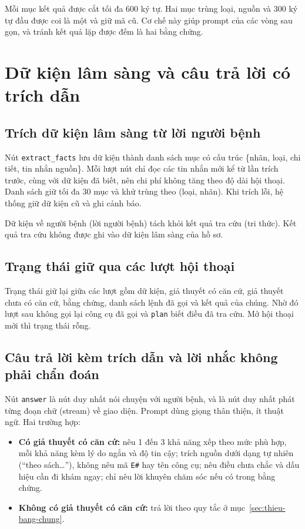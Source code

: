 Mỗi mục kết quả được cắt tối đa 600 ký tự. Hai mục trùng loại, nguồn và 300 ký tự đầu được coi là một và giữ mã cũ. Cơ chế này giúp prompt của các vòng sau gọn, và tránh kết quả lặp được đếm là hai bằng chứng.

\section{Dữ kiện lâm sàng và câu trả lời có trích dẫn}

\subsection{Trích dữ kiện lâm sàng từ lời người bệnh}

Nút \texttt{extract\_facts} lưu dữ kiện thành danh sách mục có cấu trúc \{nhãn, loại, chi tiết, tin nhắn nguồn\}. Mỗi lượt nút chỉ đọc các tin nhắn mới kể từ lần trích trước, cùng với dữ kiện đã biết, nên chi phí không tăng theo độ dài hội thoại. Danh sách giữ tối đa 30 mục và khử trùng theo (loại, nhãn). Khi trích lỗi, hệ thống giữ dữ kiện cũ và ghi cảnh báo.

Dữ kiện về người bệnh (lời người bệnh) tách khỏi kết quả tra cứu (tri thức). Kết quả tra cứu không được ghi vào dữ kiện lâm sàng của hồ sơ.

\subsection{Trạng thái giữ qua các lượt hội thoại}

Trạng thái giữ lại giữa các lượt gồm dữ kiện, giả thuyết có căn cứ, giả thuyết chưa có căn cứ, bằng chứng, danh sách lệnh đã gọi và kết quả của chúng. Nhờ đó lượt sau không gọi lại công cụ đã gọi và \texttt{plan} biết điều đã tra cứu. Mở hội thoại mới thì trạng thái rỗng.

\subsection{Câu trả lời kèm trích dẫn và lời nhắc không phải chẩn đoán}

Nút \texttt{answer} là nút duy nhất nói chuyện với người bệnh, và là nút duy nhất phát từng đoạn chữ (stream) về giao diện. Prompt dùng giọng thân thiện, ít thuật ngữ. Hai trường hợp:
\begin{itemize}
  \item \textbf{Có giả thuyết có căn cứ:} nêu 1 đến 3 khả năng xếp theo mức phù hợp, mỗi khả năng kèm lý do ngắn và độ tin cậy; trích nguồn dưới dạng tự nhiên (``theo sách\ldots''), không nêu mã \texttt{E\#} hay tên công cụ; nêu điều chưa chắc và dấu hiệu cần đi khám ngay; chỉ nêu lời khuyên chăm sóc nếu có trong bằng chứng.
  \item \textbf{Không có giả thuyết có căn cứ:} trả lời theo quy tắc ở mục~\ref{sec:thieu-bang-chung}.
\end{itemize}


